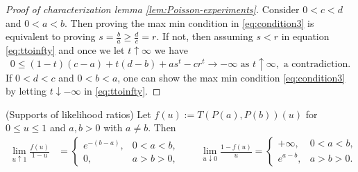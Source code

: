 \begin{proof}[Proof of characterization lemma \ref{lem:Poisson-experiments}]
    Consider $0<c<d$ and $0<a<b$. Then proving the max min condition in \ref{eq:condition3} is equivalent to proving $s =\frac{b}{a} \geq \frac{d}{c} =r$. If not, then assuming  $s <r$ in equation \ref{eq:ttoinfty} and once we let $t \uparrow \infty$ we have  
    \begin{equation}
      0\leq   (1-t)(c-a) +t(d-b) + a s^t - c r^t \to - \infty  \text{ as } t \uparrow \infty, \text{ a contradiction}.
    \end{equation}
   If  $0<d<c$ and $0<b<a$, one can show the max min condition \ref{eq:condition3} by letting $t\downarrow -\infty$  in \ref{eq:ttoinfty}.
\end{proof}
\begin{lemma}(Supports of likelihood ratios) \label{lem:ordering}
Let $f(u):=T(P(a),P(b))(u)$ for $0\le u\le 1$ and  \(a,b>0\) with \(a\neq b\). Then
\[
\begin{aligned}
\lim_{u\uparrow 1}\frac{f(u)}{1-u}
&=
\begin{cases}
e^{-(b-a)}, & 0<a<b,\\
0, & a>b>0,
\end{cases}
\qquad
\lim_{u\downarrow 0}\frac{1-f(u)}{u}
=
\begin{cases}
+\infty, & 0<a<b,\\
e^{a-b}, & a>b>0.
\end{cases}
\end{aligned}
\]
\end{lemma}

